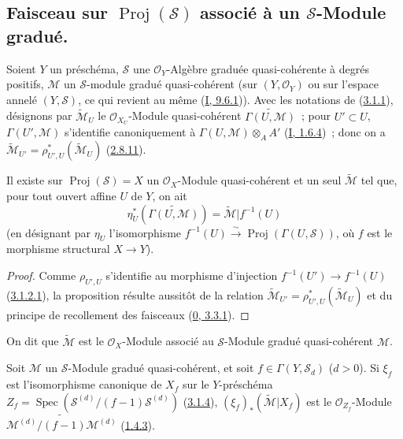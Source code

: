 \subsection{Faisceau sur $\operatorname{Proj}(\mathcal{S})$ associé à un
$\mathcal{S}$-Module gradué.}
\label{subsection:II.3.2-fr}

\begin{env}[3.2.1]
\label{II.3.2.1-fr}
Soient $Y$ un préschéma, $\mathcal{S}$ une $\mathcal{O}_Y$-Algèbre graduée
quasi-cohérente à degrés positifs, $\mathcal{M}$ un $\mathcal{S}$-module
gradué quasi-cohérent (sur $(Y,\mathcal{O}_Y)$ ou sur l'espace annelé
$(Y,\mathcal{S})$, ce qui revient au même
(\hyperref[I.9.6.1-fr]{I, 9.6.1})). Avec les notations de
(\hyperref[II.3.1.1-fr]{3.1.1}), désignons par $\widetilde{\mathcal{M}}_U$ le
$\mathcal{O}_{X_U}$-Module quasi-cohérent
$\widetilde{\Gamma(U,\mathcal{M})}$~; pour $U'\subset U$,
$\Gamma(U',\mathcal{M})$ s'identifie canoniquement à
$\Gamma(U,\mathcal{M})\otimes_A A'$ (\hyperref[I.1.6.4-fr]{I, 1.6.4})~; donc
on a $\widetilde{\mathcal{M}}_{U'}
=\rho_{U',U}^*(\widetilde{\mathcal{M}}_U)$
(\hyperref[II.2.8.11-fr]{2.8.11}).
\end{env}

\begin{proposition}[3.2.2]
\label{II.3.2.2-fr}
Il existe sur $\operatorname{Proj}(\mathcal{S})=X$ un
$\mathcal{O}_X$-Module quasi-cohérent et un seul $\widetilde{\mathcal{M}}$ tel
que, pour tout ouvert affine $U$ de $Y$, on ait
\[
  \eta_U^*(\widetilde{\Gamma(U,\mathcal{M})})
  =\widetilde{\mathcal{M}}|f^{-1}(U)
\]
(en désignant par $\eta_U$ l'isomorphisme
$f^{-1}(U)\xrightarrow{\sim}\operatorname{Proj}(\Gamma(U,\mathcal{S}))$, où
$f$ est le morphisme structural $X\to Y$).
\end{proposition}

\begin{proof}
Comme $\rho_{U',U}$ s'identifie au morphisme d'injection
$f^{-1}(U')\to f^{-1}(U)$ (\hyperref[II.3.1.2.1-fr]{3.1.2.1}), la proposition
résulte aussitôt de la relation
$\widetilde{\mathcal{M}}_{U'}=\rho_{U',U}^*(\widetilde{\mathcal{M}}_U)$ et du
principe de recollement des faisceaux (\hyperref[0.3.3.1-fr]{0, 3.3.1}).
\end{proof}

On dit que $\widetilde{\mathcal{M}}$ est le $\mathcal{O}_X$-Module associé au
$\mathcal{S}$-Module gradué quasi-cohérent $\mathcal{M}$.

\begin{proposition}[3.2.3]
\label{II.3.2.3-fr}
Soit $\mathcal{M}$ un $\mathcal{S}$-Module gradué quasi-cohérent, et soit
$f\in\Gamma(Y,\mathcal{S}_d)$ ($d>0$). Si $\xi_f$ est l'isomorphisme canonique
de $X_f$ sur le $Y$-préschéma
$Z_f=\operatorname{Spec}(\mathcal{S}^{(d)}/(f-1)\mathcal{S}^{(d)})$
(\hyperref[II.3.1.4-fr]{3.1.4}), $(\xi_f)_*(\widetilde{\mathcal{M}}|X_f)$ est
le $\mathcal{O}_{Z_f}$-Module
$\widetilde{\mathcal{M}^{(d)}/(f-1)\mathcal{M}^{(d)}}$
(\hyperref[II.1.4.3-fr]{1.4.3}).
\end{proposition}

